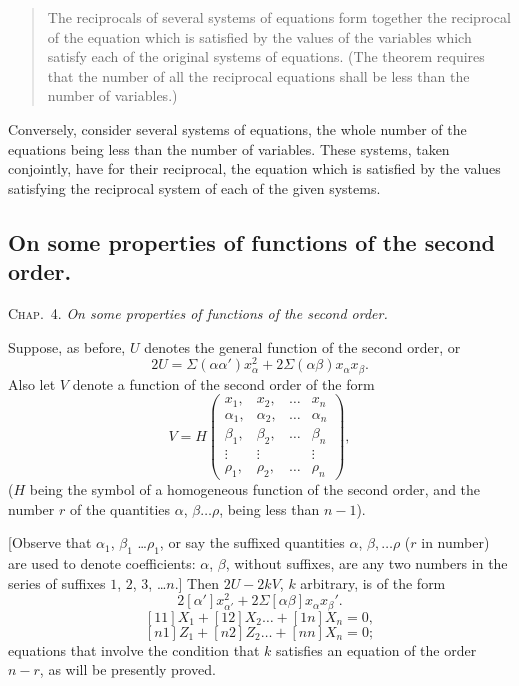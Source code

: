 \documentclass[11pt,a4paper]{article}
\theoremstyle{plain}
\theoremstyle{definition}
\theoremstyle{remark}
\begin{document}
\begin{quote}
The reciprocals of several systems of equations form together the reciprocal of
the equation which is satisfied by the values of the variables which satisfy each of
the original systems of equations. (The theorem requires that the number of all the
reciprocal equations shall be less than the number of variables.)
\end{quote}

Conversely, consider several systems of equations, the whole number of the equations
being less than the number of variables. These systems, taken conjointly, have for
their reciprocal, the equation which is satisfied by the values satisfying the reciprocal
system of each of the given systems.

\newpage
\subsection{On some properties of functions of the second order.}

\textsc{Chap.\ 4.} \textit{On some properties of functions of the second order.}

Suppose, as before, $U$ denotes the general function of the second order, or
\[
2U = \Sigma(\alpha\alpha') x_\alpha^2 + 2\Sigma(\alpha\beta) x_\alpha x_\beta \tag{21}.
\]
Also let $V$ denote a function of the second order of the form
\[
V = H\left(
\begin{array}{cccc}
x_1, & x_2, & \ldots & x_n \\
\alpha_1, & \alpha_2, & \ldots & \alpha_n \\
\beta_1, & \beta_2, & \ldots & \beta_n \\
\vdots & \vdots & & \vdots \\
\rho_1, & \rho_2, & \ldots & \rho_n
\end{array}
\right)
\tag{22},
\]
($H$ being the symbol of a homogeneous function of the second order, and the number
$r$ of the quantities $\alpha$, $\beta \ldots \rho$, being less than $n-1$).

[Observe that $\alpha_1$, $\beta_1$ \ldots $\rho_1$, or say the suffixed quantities $\alpha$, $\beta, \ldots \rho$ ($r$ in number) are used to denote
coefficients: $\alpha$, $\beta$, without suffixes, are any two numbers in the series of suffixes
$1$, $2$, $3$, \ldots $n$.] Then $2U - 2kV$, $k$ arbitrary, is of the form
\[
2[\alpha'] x_{\alpha'}^2 + 2\Sigma[\alpha\beta] x_\alpha x_\beta' \tag{23}.
\]
\[
[11] X_1 + [12] X_2 \ldots + [1n] X_n = 0,
\]
\[
[n1] Z_1 + [n2] Z_2 \ldots + [nn] X_n = 0;
\]
equations that involve the condition that $k$ satisfies an equation of the order $n-r$, as
will be presently proved.
\end{document}
